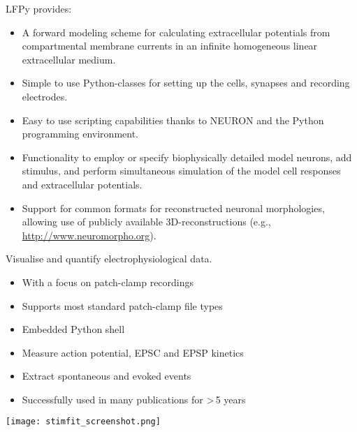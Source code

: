 \begin{multicols}{3}
LFPy provides:
\begin{itemize}[nolistsep, topsep=0em, leftmargin=1pc]
\item A forward modeling scheme for calculating extracellular potentials from compartmental membrane currents in an infinite homogeneous linear extracellular medium.
\item Simple to use Python-classes for setting up the cells, synapses and recording electrodes.
\item Easy to use scripting capabilities thanks to NEURON and the Python programming environment.
\item Functionality to employ or specify biophysically detailed model neurons, add stimulus, and perform simultaneous simulation of the model cell responses and extracellular potentials.
\item Support for common formats for reconstructed neuronal morphologies, allowing use of publicly available 3D-reconstructions (e.g., \url{http://www.neuromorpho.org}). 
\end{itemize}



\columnbreak
{}%




Visualise and quantify electrophysiological data.
\begin{itemize}[nolistsep,topsep=0em,leftmargin=1pc]
\item With a focus on patch-clamp recordings
\item Supports most standard patch-clamp file types
\item Embedded Python shell
\item Measure action potential, EPSC and EPSP kinetics
\item Extract spontaneous and evoked events
\item Successfully used in many publications for >\,5 years
\end{itemize}
\texttt{[image: stimfit\_screenshot.png]}


\end{multicols}
